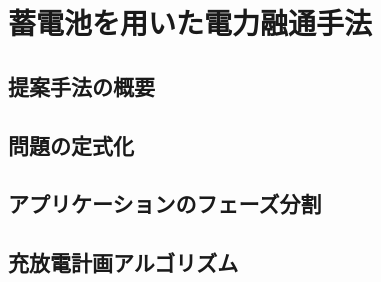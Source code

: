 \chapter{蓄電池を用いた電力融通手法}
\label{chap:proposal}



\section{提案手法の概要}
\label{sec:curb}


\section{問題の定式化}
\label{sec:formularization}


\section{アプリケーションのフェーズ分割}
\label{sec:phase}


\section{充放電計画アルゴリズム}
\label{sec:algorithm}


